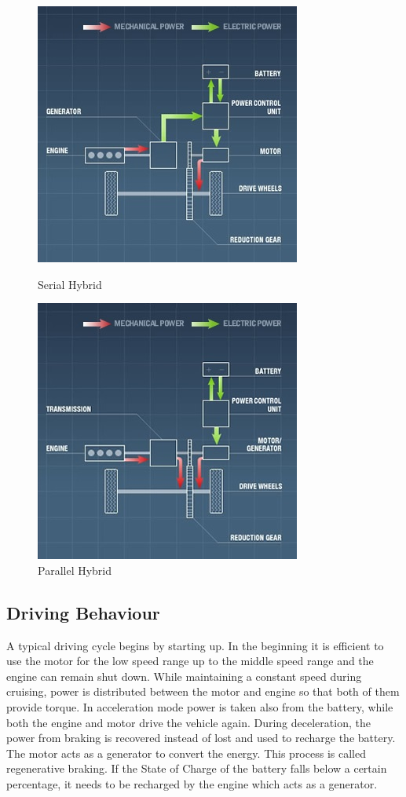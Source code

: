 \begin{figure}[h]
\centering
\begin{minipage}{.52\textwidth}
 	\centering
	\includegraphics[scale=0.59]{figures/serial}
	\caption{Serial Hybrid}
	\label{fig:serialhybrid}
\end{minipage}%
\begin{minipage}{.52\textwidth}
  	\centering
	\includegraphics[scale=0.59]{figures/parallel}
	\caption{Parallel Hybrid}
	\label{fig:parallelhybrid}
\end{minipage}
\end{figure}

\subsection{Driving Behaviour}
A typical driving cycle begins by starting up. In the beginning it is efficient to use the motor for the low speed range up to the middle speed range and the engine can remain shut down. While maintaining a constant speed during cruising, power is distributed between the motor and engine so that both of them provide torque. In acceleration mode power is taken also from the battery, while both the engine and motor drive the vehicle again. During deceleration, the power from braking is recovered instead of lost and used to recharge the battery. The motor acts as a generator to convert the energy. This process is called regenerative braking. If the State of Charge of the battery falls below a certain percentage, it needs to be recharged by the engine which acts as a generator.

